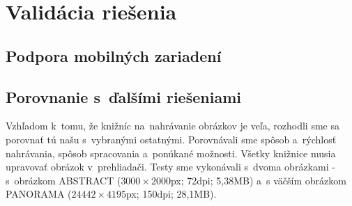 \chapter{Validácia riešenia}
\section{Podpora mobilných zariadení}


\section{Porovnanie s~ďalšími riešeniami}

Vzhľadom k~tomu, že knižníc na~nahrávanie obrázkov je veľa, rozhodli sme sa porovnať tú našu s~vybranými ostatnými. Porovnávali sme spôsob a~rýchlosť nahrávania, spôsob spracovania a~ponúkané možnosti. Všetky knižnice musia upravovať obrázok v~prehliadači.
Testy sme vykonávali s~dvoma obrázkami - s~obrázkom ABSTRACT ($3000\times2000$px; 72dpi; 5,38MB) a~s väčším obrázkom PANORAMA ($24442\times4195$px; 150dpi; 28,1MB).

